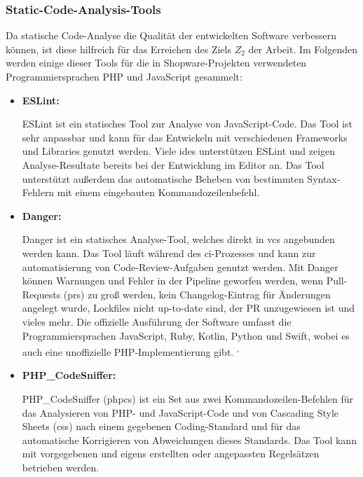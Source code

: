 \subsubsection{Static-Code-Analysis-Tools}

Da statische Code-Analyse die Qualität der entwickelten Software verbessern können, ist diese hilfreich für das
Erreichen des Ziels $Z_2$ der Arbeit.
Im Folgenden werden einige dieser Tools für die in Shopware-Projekten verwendeten Programmiersprachen PHP und JavaScript
gesammelt:

\begin{itemize}
    \item {
        \textbf{ESLint:}\par
        ESLint ist ein statisches Tool zur Analyse von JavaScript-Code.
        Das Tool ist sehr anpassbar und kann für das Entwickeln mit verschiedenen Frameworks und Libraries genutzt
        werden.
        Viele \acrshort{ide}s unterstützen ESLint und zeigen Analyse-Resultate bereits bei der Entwicklung im Editor
        an.
        Das Tool unterstützt außerdem das automatische Beheben von bestimmten Syntax-Fehlern mit einem eingebauten
        Kommandozeilenbefehl.
    }

    \item {
        \textbf{Danger:}\par
        Danger ist ein statisches Analyse-Tool, welches direkt in \acrshort{vcs} angebunden werden kann.
        Das Tool läuft während des \acrshort{ci}-Prozesses und kann zur automatisierung von Code-Review-Aufgaben
        genutzt werden.
        Mit Danger können Warnungen und Fehler in der Pipeline geworfen werden, wenn Pull-Requests (\acrshort{pr}s) zu
        groß werden, kein Changelog-Eintrag für Änderungen angelegt wurde, Lockfiles nicht up-to-date sind, der PR
        unzugewiesen ist und vieles mehr.
        Die offizielle Ausführung der Software umfasst die Programmiersprachen JavaScript, Ruby, Kotlin, Python und
        Swift, wobei es auch eine unoffizielle PHP-Implementierung gibt.
        \textsuperscript{,\ }
    }

    \item {
        \textbf{PHP\_CodeSniffer:}\par
        PHP\_CodeSniffer (\acrshort{phpcs}) ist ein Set aus zwei Kommandozeilen-Befehlen für das Analysieren von PHP-
        und JavaScript-Code und von Cascading Style Sheets (\acrshort{css}) nach einem gegebenen Coding-Standard und für
        das automatische Korrigieren von Abweichungen dieses Standards.
        Das Tool kann mit vorgegebenen und eigens erstellten oder angepassten Regelsätzen betrieben werden.
    }


\end{itemize}
